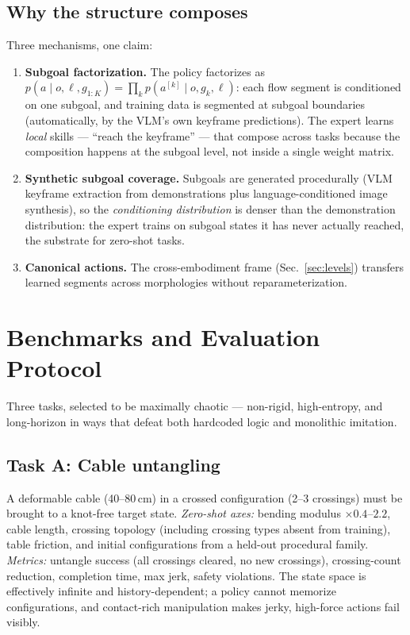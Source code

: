 \documentclass[11pt,a4paper]{article}
\begin{document}
\subsection{Why the structure composes}
\label{sec:compose}

Three mechanisms, one claim:
\begin{enumerate}[leftmargin=1.4em]
\item \textbf{Subgoal factorization.} The policy factorizes as
$p(a \mid o, \ell, g_{1:K}) = \prod_k p(a^{[k]} \mid o, g_k, \ell)$: each flow
segment is conditioned on one subgoal, and training data is segmented at subgoal
boundaries (automatically, by the VLM's own keyframe predictions). The expert
learns \emph{local} skills --- ``reach the keyframe'' --- that compose across
tasks because the composition happens at the subgoal level, not inside a single
weight matrix.
\item \textbf{Synthetic subgoal coverage.} Subgoals are generated procedurally
(VLM keyframe extraction from demonstrations plus language-conditioned image
synthesis), so the \emph{conditioning distribution} is denser than the
demonstration distribution: the expert trains on subgoal states it has never
actually reached, the substrate for zero-shot tasks.
\item \textbf{Canonical actions.} The cross-embodiment frame
(Sec.~\ref{sec:levels}) transfers learned segments across morphologies without
reparameterization.
\end{enumerate}

\section{Benchmarks and Evaluation Protocol}
\label{sec:bench}

Three tasks, selected to be maximally chaotic --- non-rigid, high-entropy, and
long-horizon in ways that defeat both hardcoded logic and monolithic imitation.

\subsection{Task A: Cable untangling}
\label{sec:taskA}
A deformable cable (40--80\,cm) in a crossed configuration (2--3 crossings) must
be brought to a knot-free target state. \emph{Zero-shot axes:} bending modulus
$\times 0.4$--$2.2$, cable length, crossing topology (including crossing types
absent from training), table friction, and initial configurations from a held-out
procedural family. \emph{Metrics:} untangle success (all crossings cleared, no
new crossings), crossing-count reduction, completion time, max jerk, safety
violations. The state space is effectively infinite and history-dependent; a
policy cannot memorize configurations, and contact-rich manipulation makes
jerky, high-force actions fail visibly.
\end{document}
